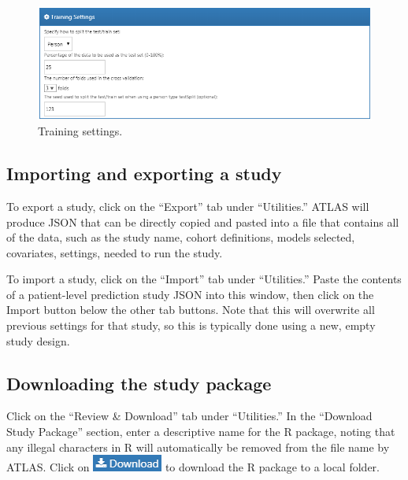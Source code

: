 \documentclass[11pt]{book}
\theoremstyle{definition}
\theoremstyle{definition}
\theoremstyle{definition}
\theoremstyle{remark}
\begin{document}
\begin{figure}

{\centering \includegraphics[width=1\linewidth]{images/PatientLevelPrediction/trainingSettings} 

}

\caption{Training settings.}\label{fig:trainingSettings}
\end{figure}

\hypertarget{importing-and-exporting-a-study}{%
\subsection{Importing and exporting a study}\label{importing-and-exporting-a-study}}

To export a study, click on the ``Export'' tab under ``Utilities.'' ATLAS will produce JSON that can be directly copied and pasted into a file that contains all of the data, such as the study name, cohort definitions, models selected, covariates, settings, needed to run the study.

To import a study, click on the ``Import'' tab under ``Utilities.'' Paste the contents of a patient-level prediction study JSON into this window, then click on the Import button below the other tab buttons. Note that this will overwrite all previous settings for that study, so this is typically done using a new, empty study design.

\hypertarget{downloading-the-study-package}{%
\subsection{Downloading the study package}\label{downloading-the-study-package}}

Click on the ``Review \& Download'' tab under ``Utilities.'' In the ``Download Study Package'' section, enter a descriptive name for the R package, noting that any illegal characters in R will automatically be removed from the file name by ATLAS. Click on \includegraphics{images/PatientLevelPrediction/download.png} to download the R package to a local folder.
\end{document}
